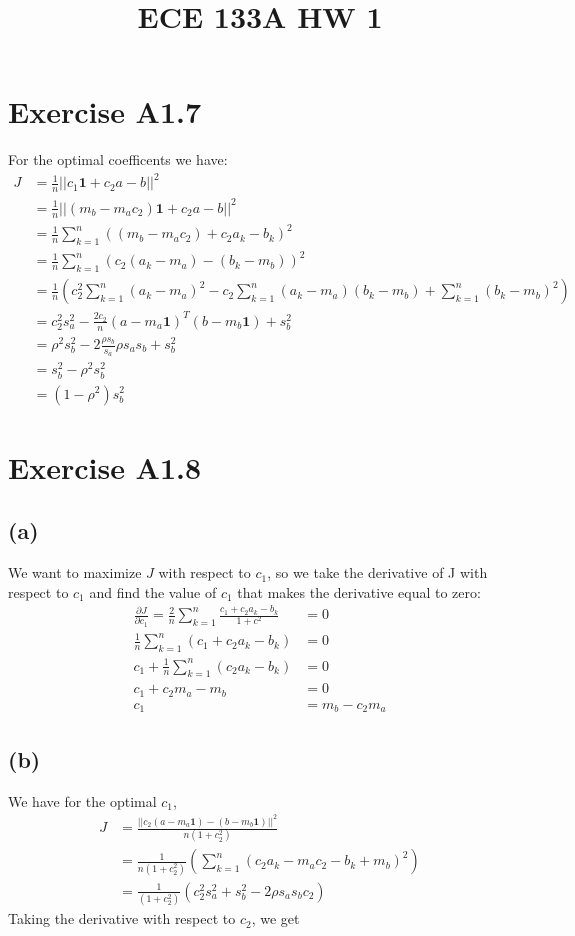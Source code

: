 
\title{ECE 133A HW 1}

\maketitle
\section*{Exercise A1.7}
For the optimal coefficents we have:
\begin{align*}
    J&=\frac{1}{n}||c_1\textbf{1}+c_2a-b||^2\\
    &=\frac{1}{n}||(m_b-m_ac_2)\textbf{1}+c_2a-b||^2\\
    &=\frac{1}{n}\sum_{k=1}^n((m_b-m_ac_2)+c_2a_k-b_k)^2\\
    &=\frac{1}{n}\sum_{k=1}^n(c_2(a_k-m_a)-(b_k-m_b))^2\\
    &=\frac{1}{n}\left(c_2^2\sum_{k=1}^n(a_k-m_a)^2-c_2\sum_{k=1}^n(a_k-m_a)(b_k-m_b) +\sum_{k=1}^n(b_k-m_b)^2\right)\\
    &=c_2^2s_a^2-\frac{2c_2}{n}(a-m_a\textbf{1})^T(b-m_b\textbf{1})+s_b^2\\
    &=\rho^2s_b^2-2\frac{\rho s_b}{s_a}\rho s_a s_b+s_b^2\\
    &=s_b^2-\rho^2 s_b^2\\
    &=\boxed{(1-\rho^2)s_b^2}
\end{align*}
\section*{Exercise A1.8}
\subsection*{(a)}
We want to maximize $J$ with respect to $c_1$, so we take the derivative of J with respect to $c_1$ and find
the value of $c_1$ that makes the derivative equal to zero:
\begin{align*}
\frac{\partial J}{\partial c_1}=\frac{2}{n}\sum_{k=1}^n\frac{c_1+c_2a_k-b_k}{1+c^2}&=0\\ 
\frac{1}{n}\sum_{k=1}^n(c_1+c_2a_k-b_k)&=0\\
c_1+\frac{1}{n}\sum_{k=1}^n(c_2a_k-b_k)&=0\\
c_1+c_2m_a-m_b&=0\\
c_1&=m_b-c_2m_a
\end{align*}
\subsection*{(b)}
We have for the optimal $c_1$, 
\begin{align*}
    J&=\frac{||c_2(a-m_a\textbf{1})-(b-m_b\textbf{1})||^2}{n(1+c_2^2)}\\
    &=\frac{1}{n(1+c_2^2)}\left(\sum_{k=1}^n(c_2a_k-m_ac_2-b_k+m_b)^2\right)\\
    &=\frac{1}{(1+c_2^2)}\left(c_2^2s_a^2+s_b^2-2\rho s_a s_b c_2\right)
\end{align*}
Taking the derivative with respect to $c_2$, we get

